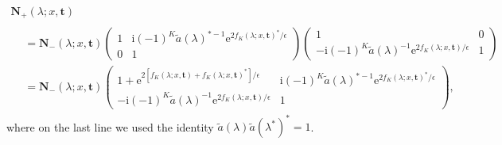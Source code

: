 \documentclass[12pt]{amsart}
\numberwithin{equation}{section}
\newcommand{\ee}{\mathrm{e}}
\newcommand{\ii}{\mathrm{i}}
\newcommand{\SP}{\lambda}
\begin{document}
\begin{multline}
\mathbf{N}_+(\SP;x,\mathbf{t})\\
\begin{aligned}
&=\mathbf{N}_-(\SP;x,\mathbf{t})\begin{pmatrix}1 & \ii(-1)^K\widetilde{a}(\SP)^{*-1}\ee^{2f_K(\SP;x,\mathbf{t})^*/\epsilon}\\0&1\end{pmatrix}\begin{pmatrix}1&0\\-\ii(-1)^K\widetilde{a}(\SP)^{-1}\ee^{2f_K(\SP;x,\mathbf{t})/\epsilon} & 1\end{pmatrix}\\
&=\mathbf{N}_-(\SP;x,\mathbf{t})\begin{pmatrix} 1+\ee^{2[f_K(\SP;x,\mathbf{t})+f_K(\SP;x,\mathbf{t})^*]/\epsilon} & \ii(-1)^K\widetilde{a}(\SP)^{*-1}\ee^{2f_K(\SP;x,\mathbf{t})^*/\epsilon}\\-\ii(-1)^K\widetilde{a}(\SP)^{-1}\ee^{2f_K(\SP;x,\mathbf{t})/\epsilon} & 1\end{pmatrix},
\end{aligned}
\label{eq:N-jump-R}
\end{multline}
where on the last line we used the identity $\widetilde{a}(\SP)\widetilde{a}(\SP^*)^*=1$.  
\end{document}
